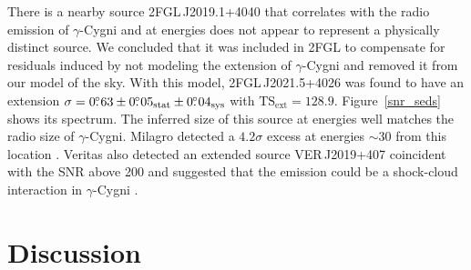 \documentclass[12pt,preprint]{aastex}
\newcommand{\gev}{\text{GeV}\xspace}
\newcommand{\tev}{\text{TeV}\xspace}
\newcommand{\tsext}{{\ensuremath{\text{TS}_{\text{ext}}}}\xspace}
\newcommand{\sys}{\text{sys}\xspace}
\newcommand{\stat}{\text{stat}\xspace}
\begin{document}
There is a nearby source 2FGL\,J2019.1+4040 that correlates with the radio
emission of $\gamma$-Cygni and at \gev energies 
does not appear to represent a physically
distinct source.  We concluded that it was included in 2FGL to compensate
for residuals induced by not modeling the extension of $\gamma$-Cygni and
removed it from our model of the sky.  With this model, 2FGL\,J2021.5+4026
was found to have an extension $\sigma=0\fdg63\pm0\fdg05_\stat\pm0\fdg04_\sys$
with $\tsext=128.9$.  Figure~\ref{snr_seds}
shows its spectrum.  The inferred size of this source at \gev energies
well matches the radio size of $\gamma$-Cygni.  Milagro detected
a $4.2\sigma$ excess at energies $\sim 30$ \tev from this location
\citep{lat_bsl,milagro_bright_source_list}.  Veritas also detected an
extended source VER\,J2019+407 coincident with the SNR above 200 \gev
and suggested that the \tev emission could be a shock-cloud interaction
in $\gamma$-Cygni \citep{veritas_gamma_cygni}.






\section{Discussion}
\end{document}
